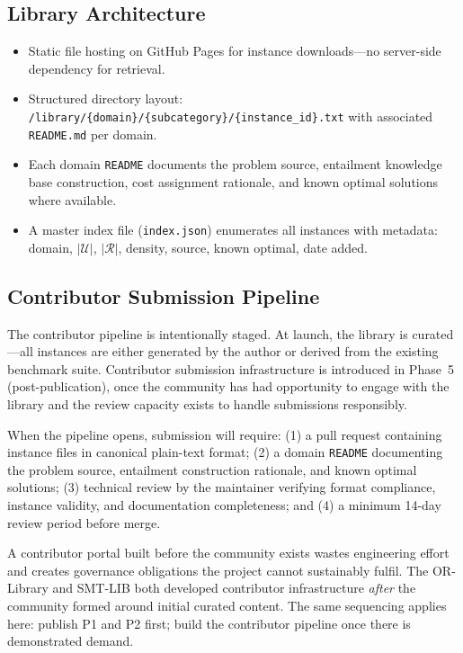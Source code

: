 \documentclass[11pt,a4paper]{report}
\newcommand{\calU}{\mathcal{U}}
\newcommand{\calR}{\mathcal{R}}
\begin{document}
\subsection{Library Architecture}

\begin{itemize}
  \item Static file hosting on GitHub Pages for instance downloads---no server-side
    dependency for retrieval.
  \item Structured directory layout:
    \texttt{/library/\{domain\}/\{subcategory\}/\{instance\_id\}.txt} with associated
    \texttt{README.md} per domain.
  \item Each domain \texttt{README} documents the problem source, entailment knowledge
    base construction, cost assignment rationale, and known optimal solutions where
    available.
  \item A master index file (\texttt{index.json}) enumerates all instances with metadata:
    domain, $|\calU|$, $|\calR|$, density, source, known optimal, date added.
\end{itemize}

\subsection{Contributor Submission Pipeline}

The contributor pipeline is intentionally staged. At launch, the library is curated---all
instances are either generated by the author or derived from the existing benchmark suite.
Contributor submission infrastructure is introduced in Phase~5 (post-publication), once
the community has had opportunity to engage with the library and the review capacity exists
to handle submissions responsibly.

When the pipeline opens, submission will require: (1) a pull request containing instance
files in canonical plain-text format; (2) a domain \texttt{README} documenting the problem
source, entailment construction rationale, and known optimal solutions; (3) technical
review by the maintainer verifying format compliance, instance validity, and documentation
completeness; and (4) a minimum 14-day review period before merge.

\begin{tcolorbox}[enhanced, colback=lightblue!40, colframe=royalblue, arc=4pt,
  fonttitle=\bfseries, title={Staged Launch Rationale}]
A contributor portal built before the community exists wastes engineering effort and
creates governance obligations the project cannot sustainably fulfil. The OR-Library and
SMT-LIB both developed contributor infrastructure \emph{after} the community formed around
initial curated content. The same sequencing applies here: publish P1 and P2 first; build
the contributor pipeline once there is demonstrated demand.
\end{tcolorbox}
\end{document}
